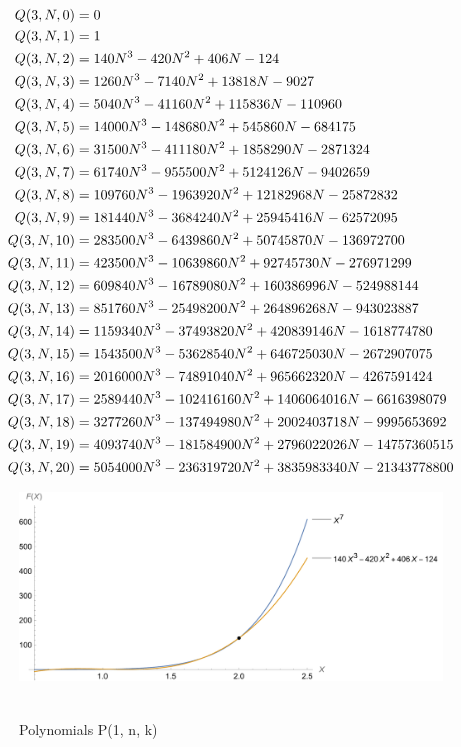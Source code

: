 ﻿\begin{align*}
    {Q}(3,N,0) &= 0 \\
    {Q}(3,N,1) &= 1 \\
    {Q}(3,N,2) &= 140N^3 - 420N^2 + 406N - 124 \\
    {Q}(3,N,3) &= 1260N^3 - 7140N^2 + 13818N - 9027 \\
    {Q}(3,N,4) &= 5040N^3 - 41160N^2 + 115836N - 110960 \\
    {Q}(3,N,5) &= 14000N^3 - 148680N^2 + 545860N - 684175 \\
    {Q}(3,N,6) &= 31500N^3 - 411180N^2 + 1858290N - 2871324 \\
    {Q}(3,N,7) &= 61740N^3 - 955500N^2 + 5124126N - 9402659 \\
    {Q}(3,N,8) &= 109760N^3 - 1963920N^2 + 12182968N - 25872832 \\
    {Q}(3,N,9) &= 181440N^3 - 3684240N^2 + 25945416N - 62572095 \\
    {Q}(3,N,10) &= 283500N^3 - 6439860N^2 + 50745870N - 136972700 \\
    {Q}(3,N,11) &= 423500N^3 - 10639860N^2 + 92745730N - 276971299 \\
    {Q}(3,N,12) &= 609840N^3 - 16789080N^2 + 160386996N - 524988144 \\
    {Q}(3,N,13) &= 851760N^3 - 25498200N^2 + 264896268N - 943023887 \\
    {Q}(3,N,14) &= 1159340N^3 - 37493820N^2 + 420839146N - 1618774780 \\
    {Q}(3,N,15) &= 1543500N^3 - 53628540N^2 + 646725030N - 2672907075 \\
    {Q}(3,N,16) &= 2016000N^3 - 74891040N^2 + 965662320N - 4267591424 \\
    {Q}(3,N,17) &= 2589440N^3 - 102416160N^2 + 1406064016N - 6616398079 \\
    {Q}(3,N,18) &= 3277260N^3 - 137494980N^2 + 2002403718N - 9995653692 \\
    {Q}(3,N,19) &= 4093740N^3 - 181584900N^2 + 2796022026N - 14757360515 \\
    {Q}(3,N,20) &= 5054000N^3 - 236319720N^2 + 3835983340N - 21343778800 \\
\end{align*}
\begin{figure}[H]
    \centering
    \includegraphics[width=1\textwidth]{sections/images/06_seventh_power_with_q_3_n_k}
    ~\caption{Polynomials P(1, n, k)}\label{fig:figure6}
\end{figure}
